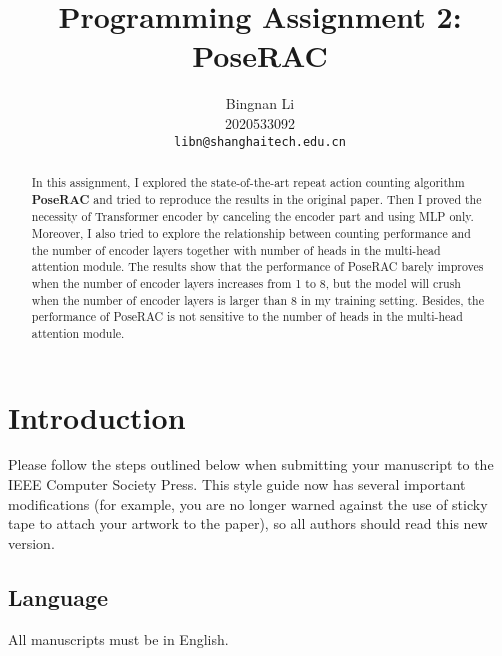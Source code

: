 \documentclass[10pt,twocolumn,letterpaper]{article}
\begin{document}
    \title{Programming Assignment 2: PoseRAC}

    \author{Bingnan Li\\
    2020533092\\
    {\tt\small libn@shanghaitech.edu.cn}
    }
    \maketitle

    \begin{abstract}
        In this assignment, I explored the state-of-the-art repeat action counting algorithm {\bf PoseRAC} and tried to
        reproduce the results in the original paper.
        Then I proved the necessity of Transformer encoder by canceling the encoder part and using MLP only.
        Moreover, I also tried to explore the relationship between counting performance and the number of encoder layers
        together with number of heads in the multi-head attention module.
        The results show that the performance of PoseRAC barely improves when the number of encoder layers increases from 1 to 8,
        but the model will crush when the number of encoder layers is larger than 8 in my training setting.
        Besides, the performance of PoseRAC is not sensitive to the number of heads in the multi-head attention module.

    \end{abstract}



    \section{Introduction}
    \label{sec:intro}

    Please follow the steps outlined below when submitting your manuscript to the IEEE Computer Society Press.
    This style guide now has several important modifications (for example, you are no longer warned against the use of sticky tape to attach your artwork to the paper), so all authors should read this new version.


    \subsection{Language}

    All manuscripts must be in English.
\end{document}
